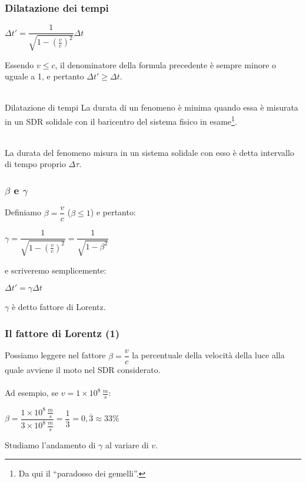 \documentclass[]{beamer}
\theoremstyle{plain}
\begin{document}
\begin{frame}
  \frametitle{Dilatazione dei tempi}
\begin{small}
    \begin{center}
$ \Delta t' = \dfrac{1}{\sqrt{1- \left( \frac{v}{c} \right)^2 }}\Delta t $
  \end{center}
  \end{small}
  Essendo $ v \leq c $, il denominatore della formula precedente è sempre minore o uguale a 1, e pertanto $ \Delta t' \geq \Delta t $.\\~\pause
  \begin{block}{Dilatazione di tempi}
    La durata di un fenomeno è minima quando essa è misurata in un SDR solidale con il baricentro del sistema fisico in esame\footnote{Da qui il ``paradosso dei gemelli''.}.
  \end{block}\pause~\\
  La durata del fenomeno misura in un sistema solidale con esso è detta \alert{intervallo di tempo proprio $ \Delta \tau $}.
\end{frame}


\begin{frame}
  \frametitle{$ \beta $ e $ \gamma $}
  Definiamo \colorbox{blue!30}{$ \beta = \dfrac{v}{c} $} ($ \beta \leq 1 $){\pause} e pertanto:
\begin{center}
  \colorbox{blue!30}{$ \gamma = \dfrac{1}{\sqrt{1- \left( \frac{v}{c} \right)^2 }} = \dfrac{1}{\sqrt{1 - \beta^2}} $}
\end{center}
{\pause}e scriveremo semplicemente:
  \begin{center}
  \colorbox{blue!30}{$ \Delta t' = \gamma\Delta t $}
  \end{center}
  $ \gamma $ è detto \alert{fattore di Lorentz}.
\end{frame}


\begin{frame}
  \frametitle{Il fattore di Lorentz (1)}
  Possiamo leggere nel fattore $ \beta = \dfrac{v}{c} $ la percentuale della velocità della luce alla quale avviene il moto nel SDR considerato.{\pause}\\~\\  
  Ad esempio, se $ v = 1 \times 10^8 \, \frac{m}{s} $:
  \begin{center}
  $ \beta = \dfrac{1 \times 10^8 \, \frac{m}{s}}{3 \times 10^8 \, \frac{m}{s}} = \dfrac{1}{3} = 0,\overline{3} \approx 33 \% $
  \end{center}
  {\pause}
  Studiamo l'andamento di $ \gamma $ al variare di $ v $.
\end{frame}
\end{document}
